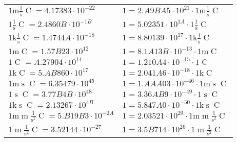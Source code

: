 \begin{center}
\begin{longtable}{l l}
{\color{gray}$1 \bm{\mathrm{ m}}{}\frac1{\operatorname{s}}{\operatorname{C}}{} = 4.17383\cdot10^{-22} $}   & {\color{gray}$ 1 = 2.A9BA5\cdot10^{21} \cdot 1 \bm{\mathrm{ m}}{}\frac1{\operatorname{s}}{\operatorname{C}}{}$}  \\
{\color{black}$1 \bm{\mathrm{ }}{}\frac1{\operatorname{s}}{\operatorname{C}}{} = 2.4860B\cdot10^{-1B} $}   & {\color{black}$ 1 = 5.02351\cdot10^{1A} \cdot 1 \bm{\mathrm{ }}{}\frac1{\operatorname{s}}{\operatorname{C}}{}$}  \\
{\color{gray}$1 \bm{\mathrm{ k}}{}\frac1{\operatorname{s}}{\operatorname{C}}{} = 1.4744A\cdot10^{-18} $}   & {\color{gray}$ 1 = 8.80139\cdot10^{17} \cdot 1 \bm{\mathrm{ k}}{}\frac1{\operatorname{s}}{\operatorname{C}}{}$}  \\
{\color{gray}$1 \bm{\mathrm{ m}}{}{}{\operatorname{C}}{} = 1.57B23\cdot10^{12} $}   & {\color{gray}$ 1 = 8.1A13B\cdot10^{-13} \cdot 1 \bm{\mathrm{ m}}{}{}{\operatorname{C}}{}$}  \\
{\color{black}$1 \bm{\mathrm{ }}{}{}{\operatorname{C}}{} = A.27904\cdot10^{14} $}   & {\color{black}$ 1 = 1.210A4\cdot10^{-15} \cdot 1 \bm{\mathrm{ }}{}{}{\operatorname{C}}{}$}  \\
{\color{gray}$1 \bm{\mathrm{ k}}{}{}{\operatorname{C}}{} = 5.AB860\cdot10^{17} $}   & {\color{gray}$ 1 = 2.041A6\cdot10^{-18} \cdot 1 \bm{\mathrm{ k}}{}{}{\operatorname{C}}{}$}  \\
{\color{gray}$1 \bm{\mathrm{ m}}{}{\operatorname{s}}{\operatorname{C}}{} = 6.35479\cdot10^{45} $}   & {\color{gray}$ 1 = 1.AAA03\cdot10^{-46} \cdot 1 \bm{\mathrm{ m}}{}{\operatorname{s}}{\operatorname{C}}{}$}  \\
{\color{black}$1 \bm{\mathrm{ }}{}{\operatorname{s}}{\operatorname{C}}{} = 3.77B4B\cdot10^{48} $}   & {\color{black}$ 1 = 3.36AB9\cdot10^{-49} \cdot 1 \bm{\mathrm{ }}{}{\operatorname{s}}{\operatorname{C}}{}$}  \\
{\color{gray}$1 \bm{\mathrm{ k}}{}{\operatorname{s}}{\operatorname{C}}{} = 2.13267\cdot10^{4B} $}   & {\color{gray}$ 1 = 5.847A0\cdot10^{-50} \cdot 1 \bm{\mathrm{ k}}{}{\operatorname{s}}{\operatorname{C}}{}$}  \\
{\color{gray}$1 \bm{\mathrm{ m}}{\operatorname{m}}\frac1{\operatorname{s}^2}{\operatorname{C}}{} = 5.B19B3\cdot10^{-2A} $}   & {\color{gray}$ 1 = 2.03521\cdot10^{29} \cdot 1 \bm{\mathrm{ m}}{\operatorname{m}}\frac1{\operatorname{s}^2}{\operatorname{C}}{}$}  \\
{\color{black}$1 \bm{\mathrm{ }}{\operatorname{m}}\frac1{\operatorname{s}^2}{\operatorname{C}}{} = 3.52144\cdot10^{-27} $}   & {\color{black}$ 1 = 3.5B714\cdot10^{26} \cdot 1 \bm{\mathrm{ }}{\operatorname{m}}\frac1{\operatorname{s}^2}{\operatorname{C}}{}$}  \\

\end{longtable}
\end{center}
